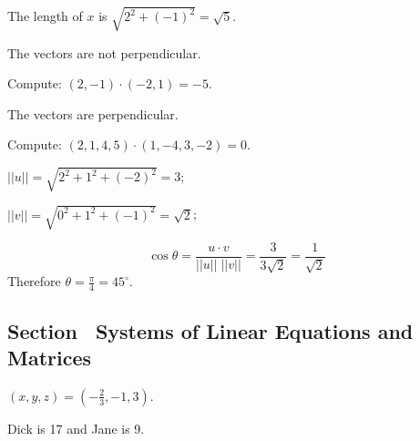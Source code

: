  \ans The length of $x$ is $\sqrt{2^2 + (-1)^2} = \sqrt{5}$.

 \ans The vectors are not perpendicular.

\soln Compute: $(2,-1) \cdot (-2,1) = -5$.


 \ans The vectors are perpendicular.

\soln Compute: $(2,1,4,5) \cdot (1,-4,3,-2) = 0$.


$||u||  =  \sqrt{2^2 + 1^2 + (-2)^2}  =  3$;

$||v||  =  \sqrt{0^2 + 1^2 + (-1)^2}  =  \sqrt{2}$;

\[
\cos \theta = \frac{u \cdot v}{||u||\;||v||}  =  \frac{3}{3\sqrt{2}} =
\frac{1}{\sqrt{2}}
\]
Therefore $\theta = \frac{\pi}{4} = 45^\circ.$

\vspace{0.1in}

\subsection*{Section~\protect{\ref{S:2.1}} Systems of Linear Equations and
Matrices}


 $(x,y,z) = (-\frac{2}{3}, -1, 3)$.


Dick is 17 and Jane is 9.
